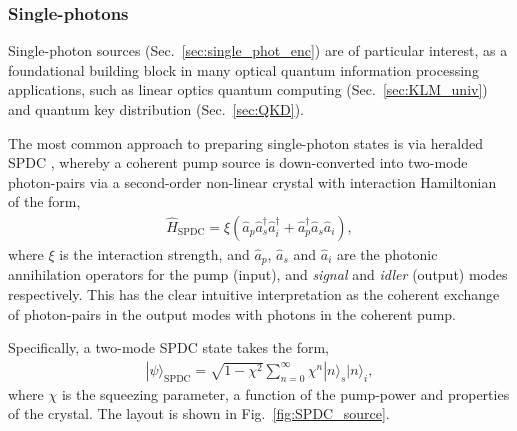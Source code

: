 \documentclass[aps, rmp, twocolumn, amsmath, amssymb, nofootinbib, superscriptaddress, longbibliography, floatfix, table-of-contents, eqsecnum]{revtex4-1}
\newcommand{\ket}[1]{|#1\rangle}
\begin{document}
%
%

\subsubsection{Single-photons} \label{sec:single_phot_src} 

Single-photon sources (Sec.~\ref{sec:single_phot_enc}) \cite{bib:Oxborrow05} are of particular interest, as a foundational building block in many optical quantum information processing applications, such as linear optics quantum computing (Sec.~\ref{sec:KLM_univ}) and quantum key distribution (Sec.~\ref{sec:QKD}).

The most common approach to preparing single-photon states is via heralded SPDC \cite{bib:URen03, bib:URen05}, whereby a coherent pump source is down-converted into two-mode photon-pairs via a second-order non-linear crystal with interaction Hamiltonian of the form,
\begin{align}
\hat{H}_\text{SPDC} = \xi(\hat{a}_p\hat{a}_s^\dag\hat{a}_i^\dag + \hat{a}_p^\dag\hat{a}_s\hat{a}_i),
\end{align}
where $\xi$ is the interaction strength, and $\hat{a}_p$, $\hat{a}_s$ and $\hat{a}_i$ are the photonic annihilation operators for the pump (input), and \textit{signal} and \textit{idler} (output) modes respectively. This has the clear intuitive interpretation as the coherent exchange of photon-pairs in the output modes with photons in the coherent pump.

Specifically, a two-mode SPDC state takes the form,
\begin{align}
\ket\psi_\text{SPDC} = \sqrt{1-\chi^2} \sum_{n=0}^\infty \chi^n \ket{n}_s\ket{n}_i,
\end{align}
where $\chi$ is the squeezing parameter, a function of the pump-power and properties of the crystal. The layout is shown in Fig.~\ref{fig:SPDC_source}.
\end{document}
